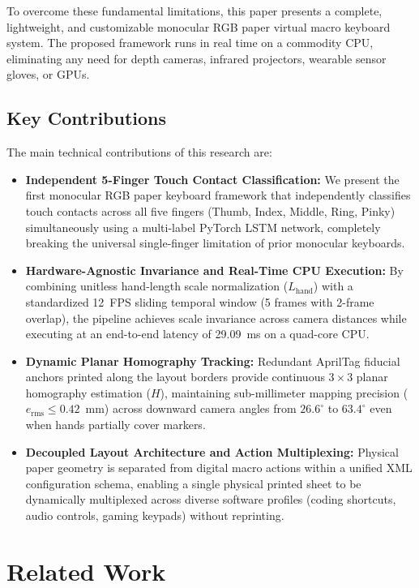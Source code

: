 \documentclass[conference]{IEEEtran}
\begin{document}
To overcome these fundamental limitations, this paper presents a complete, lightweight, and customizable monocular RGB paper virtual macro keyboard system. The proposed framework runs in real time on a commodity CPU, eliminating any need for depth cameras, infrared projectors, wearable sensor gloves, or GPUs.

\subsection{Key Contributions}
The main technical contributions of this research are:
\begin{itemize}
    \item \textbf{Independent 5-Finger Touch Contact Classification:} We present the first monocular RGB paper keyboard framework that independently classifies touch contacts across all five fingers (Thumb, Index, Middle, Ring, Pinky) simultaneously using a multi-label PyTorch LSTM network, completely breaking the universal single-finger limitation of prior monocular keyboards.
    \item \textbf{Hardware-Agnostic Invariance and Real-Time CPU Execution:} By combining unitless hand-length scale normalization ($L_{\text{hand}}$) with a standardized 12~FPS sliding temporal window (5 frames with 2-frame overlap), the pipeline achieves scale invariance across camera distances while executing at an end-to-end latency of 29.09~ms on a quad-core CPU.
    \item \textbf{Dynamic Planar Homography Tracking:} Redundant AprilTag fiducial anchors printed along the layout borders provide continuous $3 \times 3$ planar homography estimation ($H$), maintaining sub-millimeter mapping precision ($e_{\text{rms}} \le 0.42$~mm) across downward camera angles from $26.6^\circ$ to $63.4^\circ$ even when hands partially cover markers.
    \item \textbf{Decoupled Layout Architecture and Action Multiplexing:} Physical paper geometry is separated from digital macro actions within a unified XML configuration schema, enabling a single physical printed sheet to be dynamically multiplexed across diverse software profiles (coding shortcuts, audio controls, gaming keypads) without reprinting.
\end{itemize}

\section{Related Work}
\label{sec:related_work}
\end{document}
